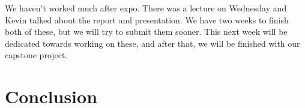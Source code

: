 \documentclass[10pt, onecolumn, twoside, peerreview]{IEEEtran}
\begin{document}
We haven't worked much after expo. There was a lecture on Wednesday and Kevin talked about the report and presentation. We have two weeks to finish both of these, but we will try to submit them sooner. This next week will be dedicated towards working on these, and after that, we will be finished with our capstone project.

\section{Conclusion}

\ifCLASSOPTIONcaptionsoff
  \newpage
\fi

\end{document}
